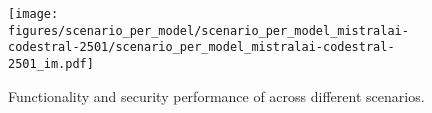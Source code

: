 
\begin{figure}[h]
    \centering
    \texttt{[image: figures/scenario\_per\_model/scenario\_per\_model\_mistralai-codestral-2501/scenario\_per\_model\_mistralai-codestral-2501\_im.pdf]}
    \caption{Functionality and security performance of \codestral{} across different scenarios.}
    \label{fig:scenario_per_model_mistralai-codestral-2501}
\end{figure}
